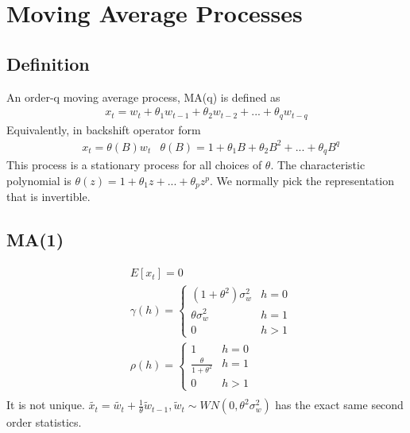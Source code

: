     
    
\section{Moving Average Processes} 

\subsection{Definition}
An order-q moving average process, MA(q) is defined as 
    \begin{align*}
        x_t = w_t + \theta_1 w_{t-1} + \theta_2 w_{t-2} + ... + \theta_q w_{t-q}
    \end{align*}
Equivalently, in backshift operator form 
    \begin{align*}
        & x_t = \theta(B)w_t & \theta(B) = 1 + \theta_1 B + \theta_2 B^2 + ... + \theta_q B^q
    \end{align*}
This process is a stationary process for all choices of $\theta$. The characteristic polynomial is $\theta(z) = 1 +\theta_1 z + ... + \theta_p z^p$. We normally pick the representation that is invertible. 

\subsection{MA(1)}
    \begin{align*}
        & E[x_t] = 0 \\
        & \gamma(h) =  
            \begin{cases}
                (1 + \theta^2)\sigma_w^2 & h = 0 \\
                \theta \sigma_w^2 & h = 1 \\
                0 & h > 1
            \end{cases} \\
        & \rho(h) = 
            \begin{cases}
                1 & h = 0 \\
                \frac{\theta}{1 + \theta^2} & h = 1 \\
                0 & h > 1
            \end{cases} \\
    \end{align*}
It is not unique. $\tilde{x_t} = \tilde{w_t} + \frac{1}{\theta} \tilde{w}_{t-1}, \tilde{w}_t \sim WN(0, \theta^2 \sigma^2_w)$ has the exact same second order statistics. \\

